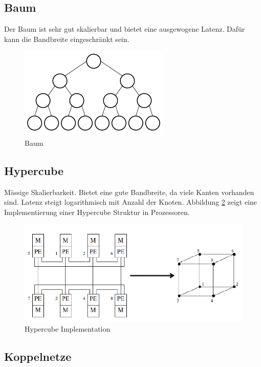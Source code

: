 \subsection{Baum}
Der Baum ist sehr gut skalierbar und bietet eine ausgewogene Latenz. Dafür kann die Bandbreite eingeschränkt sein.

\begin{figure}[h!]
	\centering
	\includegraphics[width=0.2\linewidth]{fig/baum}
	\caption{Baum}
	\label{fig:baum}
\end{figure}

\subsection{Hypercube}
Mässige Skalierbarkeit. Bietet eine gute Bandbreite, da viele Kanten vorhanden sind. Latenz steigt logarithmisch mit Anzahl der Knoten. Abbildung \ref{fig:hypercube_impl} zeigt eine Implementierung einer Hypercube Struktur in Prozessoren.

\begin{figure}[h!]
\centering
\includegraphics[width=0.5\linewidth]{fig/hypercube_impl}
\caption{Hypercube Implementation}
\label{fig:hypercube_impl}
\end{figure}

\subsection{Koppelnetze}

